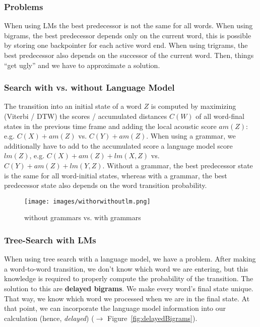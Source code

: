 \subsubsection{Problems}

When using LMs the best predecessor is not the same for all words.
When using bigrams, the best predecessor depends only on the current word, this is possible by storing one backpointer for each active word end. When using trigrams, the best predecessor also depends on the successor of the current word. Then, things ``get ugly'' and we have to approximate a solution.

\subsubsection{Search with vs. without Language Model}

The transition into an initial state of a word $Z$ is computed by maximizing (Viterbi / DTW) the scores / accumulated distances $C(W)$ of all word-final states in the previous time frame and adding the local acoustic score $am(Z)$: e.g. $C(X) + am(Z)$ vs. $C(Y) + am(Z)$. When using a grammar, we additionally have to add to the accumulated score a language model score $lm(Z)$, e.g. $C(X) + am(Z) + lm(X, Z)$ vs. $C(Y) + am(Z) + lm(Y,Z)$. Without a grammar, the best predecessor state is the same for all word-initial states, whereas with a grammar, the best predecessor state also depends on the word transition probability.

\begin{figure}[htb]
\centering
\texttt{[image: images/withorwithoutlm.png]}
\caption{\label{fig:NoLmvsLM} without grammars vs. with grammars}
\end{figure}

\subsubsection{Tree-Search with LMs}


When using tree search with a language model, we have a problem. After making a word-to-word transition, we don't know which word we are entering, but this knowledge is required to properly compute the probability of the transition. The solution to this are \textbf{delayed bigrams}. We make every word's final state unique. That way, we know which word we processed when we are in the final state. At that point, we can incorporate the language model information into our calculation (hence,
\textit{delayed}) ($\to$ Figure~\ref{fig:delayedBigrams}).

